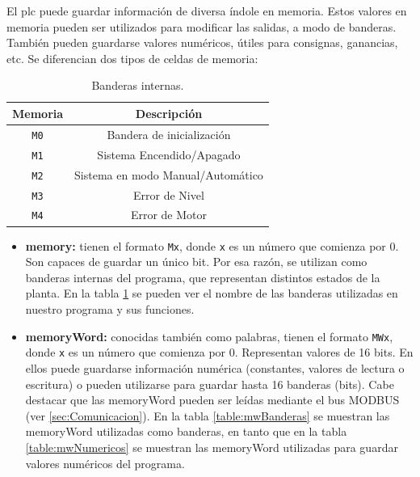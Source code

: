 El \gls{plc} puede guardar información de diversa índole en memoria.
Estos valores en memoria pueden ser utilizados para modificar las salidas, a
modo de banderas.
También pueden guardarse valores numéricos, útiles para consignas,
ganancias, etc.
Se diferencian dos tipos de celdas de memoria:

\begin{table}[ht]
\renewcommand{\arraystretch}{1.3}
\centering
\begin{tabular}{c||c}
\hline
\bfseries Memoria & \bfseries Descripción\\
\hline \hline
\verb|M0|  & Bandera de inicialización\\
\verb|M1|  & Sistema Encendido/Apagado\\
\verb|M2|  & Sistema en modo Manual/Automático\\
\verb|M3|  & Error de Nivel\\
\verb|M4|  & Error de Motor\\
\hline
\end{tabular}
\caption{Banderas internas.}
\label{table:Banderasinternas}
\end{table}

\begin{itemize}
 \item \textbf{\gls{memory}:} tienen el formato \verb|Mx|, donde \verb|x| es un
número que comienza por $0$.
Son capaces de guardar un único bit.
Por esa razón, se utilizan como banderas internas del programa, que representan
distintos estados de la planta.
En la tabla \ref{table:Banderasinternas} se pueden ver el nombre
de las banderas utilizadas en nuestro programa y sus funciones.
 \item \textbf{\gls{memoryWord}:} conocidas también como palabras, tienen el
formato \verb|MWx|, donde \verb|x| es un número que comienza por $0$.
Representan valores de 16 bits. En ellos puede guardarse información numérica
(constantes, valores de lectura o escritura) o pueden utilizarse para guardar
hasta 16 banderas (bits).
Cabe destacar que las \gls{memoryWord} pueden ser leídas mediante el bus MODBUS
(ver \ref{sec:Comunicacion}).
En la tabla  \ref{table:mwBanderas} se muestran las \gls{memoryWord}
utilizadas como banderas, en tanto que en la tabla
\ref{table:mwNumericos}
se muestran las \gls{memoryWord} utilizadas para guardar valores numéricos del
programa.
\end{itemize}


